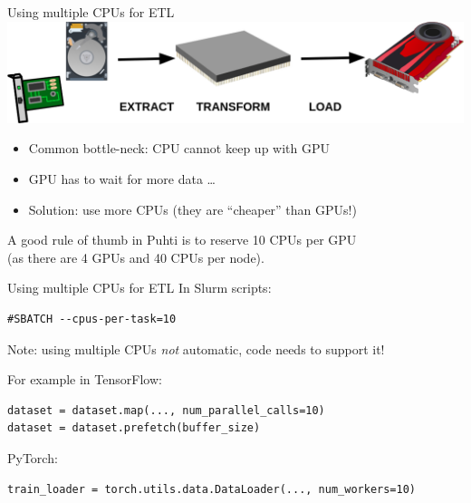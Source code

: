 \documentclass[aspectratio=1610,14pt]{beamer}
\begin{document}
\begin{frame}[fragile]{Using multiple CPUs for ETL}
  \includegraphics[width=\textwidth]{etl}

  \begin{itemize}
  \item Common bottle-neck: CPU cannot keep up with GPU
  \item GPU has to wait for more data \ldots
  \item Solution: use more CPUs (they are ``cheaper'' than GPUs!)
  \end{itemize}

  \vspace{0.5em}
  
  A good \alert{rule of thumb in Puhti is to reserve 10 CPUs per GPU} \\
  (as there are 4 GPUs and 40 CPUs per node).

\end{frame}

\begin{frame}[fragile]{Using multiple CPUs for ETL}
  In Slurm scripts:
\begin{verbatim}
#SBATCH --cpus-per-task=10
\end{verbatim}

\vspace{0.5em}

\alert{Note:} using multiple CPUs \emph{not} automatic, code needs to support it!

\vspace{0.5em}

  For example in TensorFlow:

\begin{verbatim}
dataset = dataset.map(..., num_parallel_calls=10)
dataset = dataset.prefetch(buffer_size)
\end{verbatim}

  PyTorch:

\begin{verbatim}
train_loader = torch.utils.data.DataLoader(..., num_workers=10)
\end{verbatim}
\end{frame}
\end{document}
